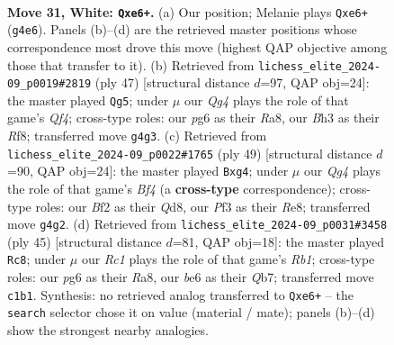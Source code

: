\documentclass[11pt]{article}
\begin{document}
\begin{figure}[p]
\label{fig:thought-m58}
\end{figure}

\clearpage

\begin{figure}[p]\centering
\begin{subfigure}{0.46\textwidth}\centering
\resizebox{\linewidth}{!}{%
\newchessgame
\chessboard[
  setfen={r3k2r/1q4bp/p1npb1p1/4p1P1/1p2P1QP/5P1B/PPPK1B2/R1R5 w - - 0 31},
  showmover=false,
  pgfstyle=straightmove, color=movearrow, markmove={g4-e6}
]}
\caption{}
\end{subfigure}\hfill
\begin{subfigure}{0.46\textwidth}\centering
\resizebox{\linewidth}{!}{%
\newchessgame
\chessboard[
  setfen={r4r2/1p4bk/pB1p3p/3Ppq1n/P4p1N/7P/1P1Q1PP1/R3R1K1 b - - 1 24},
  showmover=false,
  pgfstyle=straightmove, color=movearrow, markmove={f5-g5}
]}
\caption{}
\end{subfigure}
\\[4pt]
\begin{subfigure}{0.46\textwidth}\centering
\resizebox{\linewidth}{!}{%
\newchessgame
\chessboard[
  setfen={1r1qrb2/5p1k/3p2pp/1p1Ppb2/6P1/1BP1BN2/1P1Q1P2/R3R1K1 b - - 0 25},
  showmover=false,
  pgfstyle=straightmove, color=movearrow, markmove={f5-g4}
]}
\caption{}
\end{subfigure}\hfill
\begin{subfigure}{0.46\textwidth}\centering
\resizebox{\linewidth}{!}{%
\newchessgame
\chessboard[
  setfen={rr4k1/1q2bpp1/pBp1p2p/P2pP3/1P2bP2/2P1Q3/4B1PP/R1R3K1 b - - 10 23},
  showmover=false,
  pgfstyle=straightmove, color=movearrow, markmove={b8-c8}
]}
\caption{}
\end{subfigure}
\caption{\textbf{Move 31, White: \texttt{Qxe6+}.} (a) Our position; Melanie plays \texttt{Qxe6+} (\texttt{g4e6}). Panels (b)--(d) are the retrieved master positions whose correspondence most drove this move (highest QAP objective among those that transfer to it). (b) Retrieved from \texttt{lichess\_elite\_2024-09\_p0019\#2819} (ply 47) [structural distance $d$=97, QAP obj=24]: the master played \texttt{Qg5}; under $\mu$ our \emph{Qg4} plays the role of that game's \emph{Qf4}; cross-type roles: our \emph{p}g6 as their \emph{R}a8, our \emph{B}h3 as their \emph{R}f8; transferred move \texttt{g4g3}. (c) Retrieved from \texttt{lichess\_elite\_2024-09\_p0022\#1765} (ply 49) [structural distance $d$=90, QAP obj=24]: the master played \texttt{Bxg4}; under $\mu$ our \emph{Qg4} plays the role of that game's \emph{Bf4} (a \textbf{cross-type} correspondence); cross-type roles: our \emph{B}f2 as their \emph{Q}d8, our \emph{P}f3 as their \emph{R}e8; transferred move \texttt{g4g2}. (d) Retrieved from \texttt{lichess\_elite\_2024-09\_p0031\#3458} (ply 45) [structural distance $d$=81, QAP obj=18]: the master played \texttt{Rc8}; under $\mu$ our \emph{Rc1} plays the role of that game's \emph{Rb1}; cross-type roles: our \emph{p}g6 as their \emph{R}a8, our \emph{b}e6 as their \emph{Q}b7; transferred move \texttt{c1b1}. Synthesis: no retrieved analog transferred to \texttt{Qxe6+} -- the \texttt{search} selector chose it on value (material / mate); panels (b)--(d) show the strongest nearby analogies.}
\label{fig:thought-m60}
\end{figure}
\end{document}
